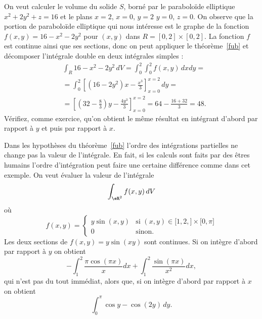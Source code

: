 \begin{example}
	On veut calculer le volume du solide \( S\), borné par le paraboloïde elliptique \( x^2+2y^2+z=16\) et le plans \( x=2\), \( x=0\), \( y=2\) \( y=0\), \( z=0\). On observe que la portion de  paraboloïde elliptique qui nous intéresse est le graphe de la fonction \( f(x,y)=16-x^2-2y^2\) pour \( (x,y)\) dans \( R=[0,2]\times[0,2]\). La fonction \( f\) est continue ainsi que ses sections, donc on peut appliquer le théorème~\ref{fub} et décomposer l'intégrale double en deux intégrales simples :
	\begin{equation}
		\begin{aligned}
			 & \int_R 16-x^2-2y^2 \,dV= \int_{0}^2\int_{0}^2f(x,y)\,dx dy=                                        \\
			 & =\int_0^2 \left[(16-2y^2)x-\frac{x^3}{3}\right]_{x=0}^{x=2}\, dy =                                 \\
			 & = \left[ \left(32-\frac{8}{3}\right) y -\frac{4y^3}{3}\right]_{x=0}^{x=2}= 64- \frac{16+32}{3}=48.
		\end{aligned}
	\end{equation}
	Vérifiez, comme exercice, qu'on obtient le même résultat en intégrant d'abord par rapport à \( y\) et puis par rapport à \( x\).
\end{example}

\begin{example}
	Dans les hypothèses du théorème~\ref{fub}  l'ordre des intégrations partielles ne change pas la valeur de l'intégrale. En fait, si les calculs sont faits par des êtres humains l'ordre d'intégration peut faire une certaine différence comme dans cet exemple. On veut évaluer la valeur de l'intégrale
	\[
		\int_{\eR^2}f(x,y)\, dV
	\]
	où
	\begin{equation}
		f(x,y)=\begin{cases}
			y\sin(x,y) & \text{si }(x,y)\in\mathopen[ 1,2 ,  \mathclose]\times\mathopen[ 0 , \pi \mathclose] \\
			0          & \text{sinon.}
		\end{cases}
	\end{equation}
	Les deux sections de \( f(x,y)=y\sin(xy)\) sont continues. Si on intègre d'abord par rapport à \( y\) on obtient
	\[
		-\int_1^2\frac{ \pi\cos(\pi x) }{ x }dx+\int_1^2\frac{ \sin(\pi x) }{ x^2 }dx,
	\]
	qui n'est pas du tout immédiat, alors que, si on intègre d'abord par rapport à \( x\) on obtient
	\[
		\int_0^\pi \cos y - \cos(2y)\,dy.
	\]
\end{example}

